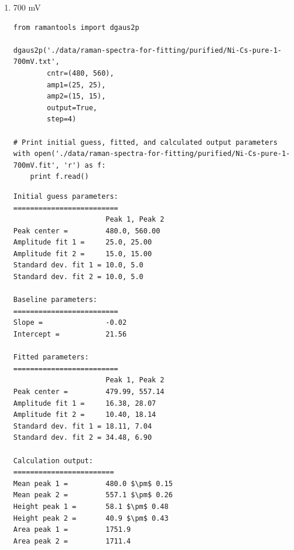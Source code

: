 \documentclass[journal=jpccck,manuscript=suppinfo,email=true]{achemso}
\begin{document}
\begin{enumerate}
\begin{enumerate}
\begin{enumerate}
\begin{verbatim}
Baseline parameters:
=========================
Slope =               -0.02
Intercept =           21.12

Fitted parameters:
=========================
                      Peak 1, Peak 2
Peak center =         479.26, 557.07
Amplitude fit 1 =     16.45, 27.02
Amplitude fit 2 =     11.32, 14.54
Standard dev. fit 1 = 18.12, 7.04
Standard dev. fit 2 = 28.89, 6.63

Calculation output:
========================
Mean peak 1 =         479.3 $\pm$ 0.15
Mean peak 2 =         557.1 $\pm$ 0.30
Height peak 1 =       57.4 $\pm$ 0.48
Height peak 2 =       38.6 $\pm$ 0.44
Area peak 1 =         1731.1
Area peak 2 =         1500.6
\end{verbatim}

\item 700 mV
\label{sec-4-1-0-2-1-2}
\begin{verbatim}
from ramantools import dgaus2p

dgaus2p('./data/raman-spectra-for-fitting/purified/Ni-Cs-pure-1-700mV.txt',
        cntr=(480, 560),
        amp1=(25, 25),
        amp2=(15, 15),
        output=True,
        step=4)

# Print initial guess, fitted, and calculated output parameters
with open('./data/raman-spectra-for-fitting/purified/Ni-Cs-pure-1-700mV.fit', 'r') as f:
    print f.read()
\end{verbatim}

\begin{verbatim}
Initial guess parameters:
=========================
                      Peak 1, Peak 2
Peak center =         480.0, 560.00
Amplitude fit 1 =     25.0, 25.00
Amplitude fit 2 =     15.0, 15.00
Standard dev. fit 1 = 10.0, 5.0
Standard dev. fit 2 = 10.0, 5.0

Baseline parameters:
=========================
Slope =               -0.02
Intercept =           21.56

Fitted parameters:
=========================
                      Peak 1, Peak 2
Peak center =         479.99, 557.14
Amplitude fit 1 =     16.38, 28.07
Amplitude fit 2 =     10.40, 18.14
Standard dev. fit 1 = 18.11, 7.04
Standard dev. fit 2 = 34.48, 6.90

Calculation output:
========================
Mean peak 1 =         480.0 $\pm$ 0.15
Mean peak 2 =         557.1 $\pm$ 0.26
Height peak 1 =       58.1 $\pm$ 0.48
Height peak 2 =       40.9 $\pm$ 0.43
Area peak 1 =         1751.9
Area peak 2 =         1711.4
\end{verbatim}


\end{enumerate}
\end{enumerate}
\end{enumerate}
\end{document}
